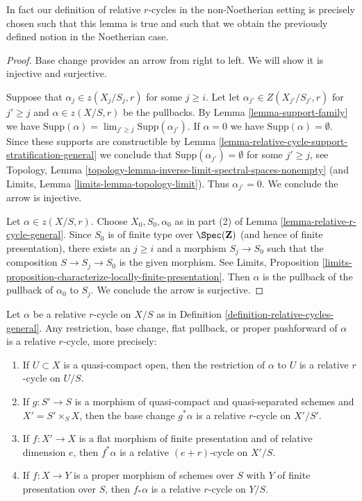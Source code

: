 \noindent
In fact our definition of relative $r$-cycles in the non-Noetherian
setting is precisely chosen such that this lemma is true and such that
we obtain the previously defined notion in the Noetherian case.

\begin{proof}
Base change provides an arrow from right to left.
We will show it is injective and surjective.

\medskip\noindent
Suppose that $\alpha_j \in z(X_j/S_j, r)$ for some $j \geq i$. Let
let $\alpha_{j'} \in Z(X_{j'}/S_{j'}, r)$ for $j' \geq j$ and
$\alpha \in z(X/S, r)$ be the pullbacks. By Lemma \ref{lemma-support-family}
we have $\text{Supp}(\alpha) = \lim_{j' \geq j} \text{Supp}(\alpha_{j'})$.
If $\alpha = 0$ we have $\text{Supp}(\alpha) = \emptyset$.
Since these supports are constructible by
Lemma \ref{lemma-relative-cycle-support-stratification-general}
we conclude that $\text{Supp}(\alpha_{j'}) = \emptyset$
for some $j' \geq j$, see Topology, Lemma
\ref{topology-lemma-inverse-limit-spectral-spaces-nonempty}
(and Limits, Lemma \ref{limits-lemma-topology-limit}).
Thus $\alpha_{j'} = 0$. We conclude the arrow is injective.

\medskip\noindent
Let $\alpha \in z(X/S, r)$. Choose $X_0, S_0, \alpha_0$
as in part (2) of Lemma \ref{lemma-relative-r-cycle-general}.
Since $S_0$ is of finite
type over $\Spec(\mathbf{Z})$ (and hence of finite presentation),
there exists an $j \geq i$ and a morphism $S_j \to S_0$ such
that the composition $S \to S_j \to S_0$ is the given morphism.
See Limits, Proposition
\ref{limits-proposition-characterize-locally-finite-presentation}.
Then $\alpha$ is the pullback of the pullback of $\alpha_0$
to $S_j$. We conclude the arrow is surjective.
\end{proof}

\begin{lemma}
\label{lemma-relative-cycle-functoriality-general}
Let $\alpha$ be a relative $r$-cycle on $X/S$ as in
Definition \ref{definition-relative-cycles-general}.
Any restriction, base change, flat pullback, or proper pushforward
of $\alpha$ is a relative $r$-cycle, more precisely:
\begin{enumerate}
\item If $U \subset X$ is a quasi-compact open, then the restriction
of $\alpha$ to $U$ is a relative $r$-cycle on $U/S$.
\item If $g : S' \to S$ is a morphism of quasi-compact and
quasi-separated schemes and $X' = S' \times_S X$, then
the base change $g^*\alpha$ is a relative $r$-cycle on $X'/S'$.
\item If $f : X' \to X$ is a flat morphism of finite presentation
and of relative dimension $e$, then $f^*\alpha$ is a relative
$(e + r)$-cycle on $X'/S$.
\item If $f : X \to Y$ is a proper morphism of schemes over $S$
with $Y$ of finite presentation over $S$, then $f_*\alpha$
is a relative $r$-cycle on $Y/S$.
\end{enumerate}
\end{lemma}

